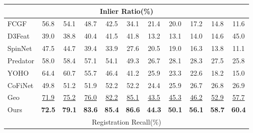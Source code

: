\begin{table}[htp]
\begin{tabular}{lcccccccccc}
    \\ \hline
    \multicolumn{11}{c}{Inlier Ratio(\%)} 
    \\ \hline

    \multicolumn{1}{l}{FCGF}
    & 56.8  & 54.1  & 48.7  & 42.5  & \multicolumn{1}{c}{34.1}
    & 21.4  & 20.0  & 17.2  & 14.8  & 11.6
    \\
    \multicolumn{1}{l}{D3Feat}
    & 39.0  & 38.8  & 40.4  & 41.5  & \multicolumn{1}{c}{41.8}
    & 13.2  & 13.1  & 14.0  & 14.6  & 45.0
    \\
    \multicolumn{1}{l}{SpinNet}
    & 47.5  & 44.7  & 39.4  & 33.9  & \multicolumn{1}{c}{27.6}
    & 20.5  & 19.0  & 16.3  & 13.8  & 11.1
    \\
    \multicolumn{1}{l}{Predator}
    & 58.0  & 58.4  & 57.1  & 54.1  & \multicolumn{1}{c}{49.3}
    & 26.7  & 28.1  & 28.3  & 27.5  & 25.8
    \\
    \multicolumn{1}{l}{YOHO}
    & 64.4  & 60.7  & 55.7  & 46.4  & \multicolumn{1}{c}{41.2}
    & 25.9  & 23.3  & 22.6  & 18.2  & 15.0
    \\
    \multicolumn{1}{l}{CoFiNet}
    & 49.8  & 51.2  & 51.9  & 52.2  & \multicolumn{1}{c}{52.2}
    & 24.4  & 25.9  & 26.7  & 26.8  & 26.9
    \\
    \multicolumn{1}{l}{Geo}
    & \ul{71.9}  & \ul{75.2}  & \ul{76.0}  & \ul{82.2}  & \multicolumn{1}{c}{\ul{85.1}}
    & \ul{43.5}  & \ul{45.3}  & \ul{46.2}  & \ul{52.9}  & \ul{57.7}
    \\
    \multicolumn{1}{l}{Ours}
    & \textbf{72.5} & \textbf{79.1} & \textbf{83.6} & \textbf{85.4} & \multicolumn{1}{c}{\textbf{86.6}}
    & \textbf{44.3} & \textbf{50.1} & \textbf{56.1} & \textbf{58.7} & \textbf{60.4} 

    \\ \hline
    \multicolumn{11}{c}{Registration Recall(\%)} 
    \\ \hline


\end{tabular}
\end{table}
